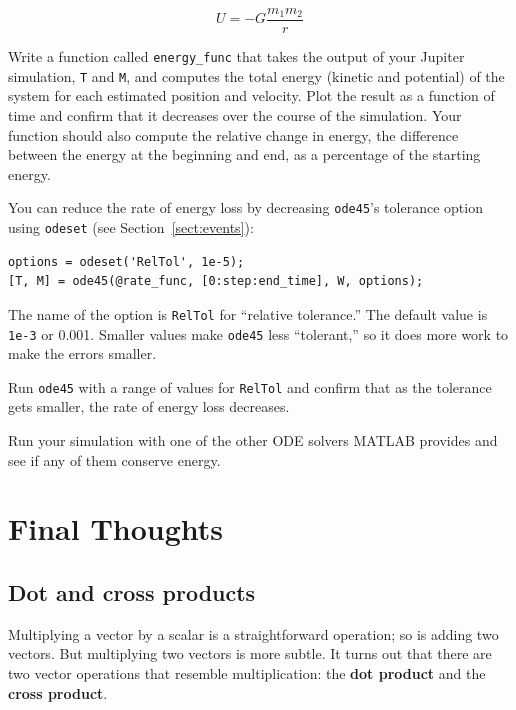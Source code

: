\documentclass[
]{book}
\begin{document}
\begin{equation}
U = -G \frac{m_1 m_2}{r}
\end{equation}

\begin{ex}
Write a function called {\tt energy\_func} that takes the output of
your Jupiter simulation, {\tt T} and {\tt M}, and computes the total
energy (kinetic and potential) of the system for each estimated
position and velocity.  Plot the result as a function of time and
confirm that it decreases over the course of the simulation.  Your
function should also compute the relative change in energy, the
difference between the energy at the beginning and end, as a
percentage of the starting energy.
\end{ex}

You can reduce the rate of energy loss by decreasing {\tt ode45}'s
tolerance option using {\tt odeset} (see Section~\ref{sect:events}):

\begin{verbatim}
options = odeset('RelTol', 1e-5);
[T, M] = ode45(@rate_func, [0:step:end_time], W, options);
\end{verbatim}
%
The name of the option is {\tt RelTol} for ``relative tolerance.''
The default value is {\tt 1e-3} or 0.001.  Smaller values
make {\tt ode45} less ``tolerant,'' so it does more work to
make the errors smaller.

\begin{ex}
Run {\tt ode45} with a range of values for {\tt RelTol} and confirm
that as the tolerance gets smaller, the rate of energy loss
decreases.
\end{ex}

\begin{ex}
Run your simulation with one of the other ODE solvers MATLAB provides
and see if any of them conserve energy.
\end{ex}



\chapter{Final Thoughts}

\section{Dot and cross products}

Multiplying a vector by a scalar is a straightforward operation;
so is adding two vectors.  But multiplying two vectors is more
subtle.  It turns out that there are two vector operations that
resemble multiplication: the {\bf dot product}
and the {\bf cross product}.
\end{document}
